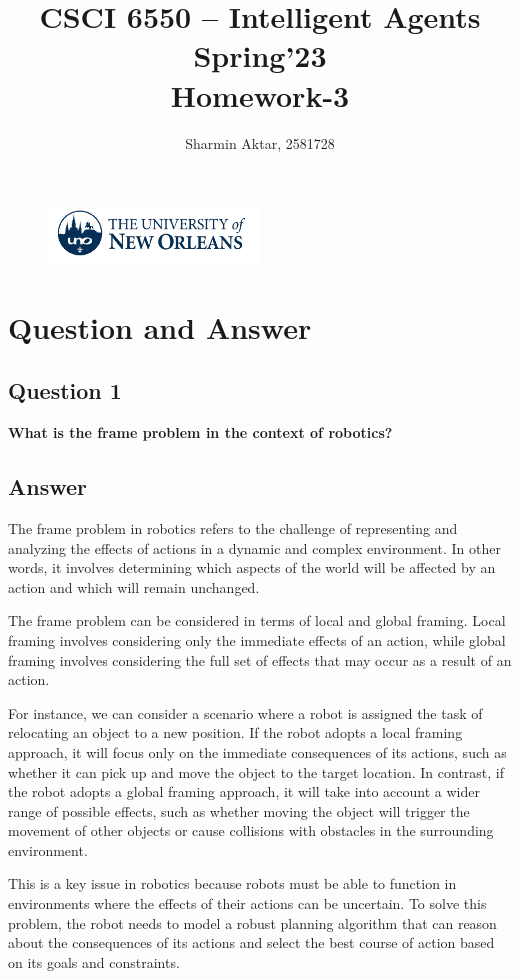 \documentclass[12]{article}
\title{\textbf{CSCI 6550 – Intelligent Agents\\Spring'23}\\\textbf{Homework-3}}
\author{Sharmin Aktar, 2581728}
\begin{document}
\begin{figure}
\centering
\includegraphics[width=0.5\textwidth]{images/uno_logo.png}
\end{figure}

\maketitle

\section*{Question and Answer}

\subsection*{Question 1}
\textbf{What is the frame problem in the context of robotics?}


\subsection*{Answer}
The frame problem in robotics refers to the challenge of representing and analyzing the effects of actions in a dynamic and complex environment. In other words, it involves determining which aspects of the world will be affected by an action and which will remain unchanged. 

The frame problem can be considered in terms of local and global framing.
Local framing involves considering only the immediate effects of an action, while global framing involves considering the full set of effects that may occur as a result of an action.

For instance, we can consider a scenario where a robot is assigned the task of relocating an object to a new position. If the robot adopts a local framing approach, it will focus only on the immediate consequences of its actions, such as whether it can pick up and move the object to the target location. In contrast, if the robot adopts a global framing approach, it will take into account a wider range of possible effects, such as whether moving the object will trigger the movement of other objects or cause collisions with obstacles in the surrounding environment.

This is a key issue in robotics because robots must be able to function in environments where the effects of their actions can be uncertain. To solve this problem, the robot needs to model a robust planning algorithm that can reason about the consequences of its actions and select the best course of action based on its goals and constraints.
\end{document}
